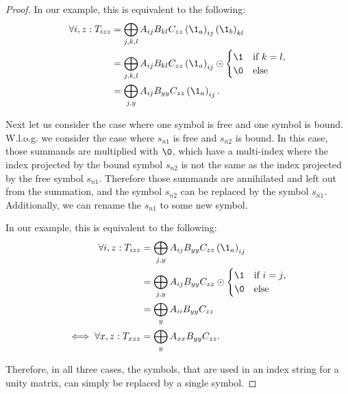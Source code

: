 \begin{proof}
    In our example, this is equivalent to the following:
    \begin{align*}
        \forall i,z: T_{izz} & = \bigoplus\limits_{j,k,l} A_{ij} B_{kl} C_{zz} \left(\1_a\right)_{ij} \left(\1_b\right)_{kl}          \\
                             & = \bigoplus\limits_{j,k,l} A_{ij} B_{kl} C_{zz} \left(\1_a\right)_{ij} \odot \begin{cases}
            \1 & \text{if $k = l$}, \\
            \0 & \text{else}
        \end{cases} \\
                             & = \bigoplus\limits_{j,y} A_{ij} B_{yy} C_{zz} \left(\1_a\right)_{ij}.
    \end{align*}

    Next let us consider the case where one symbol is free and one symbol is bound.
    W.l.o.g. we consider the case where $s_{n1}$ is free and $s_{n2}$ is bound.
    In this case, those summands are multiplied with $\0$,
    which have a multi-index where the index projected by the bound symbol $s_{n2}$ is not the same as the index projected by the free symbol $s_{n1}$.
    Therefore those summands are annihilated and left out from the summation, and the symbol $s_{n2}$ can be replaced by the symbol $s_{n1}$.
    Additionally, we can rename the $s_{n1}$ to some new symbol.

    In our example, this is equivalent to the following:
    \begin{align*}
        \forall i,z: T_{izz}      & = \bigoplus\limits_{j,y} A_{ij} B_{yy} C_{zz} \left(\1_a\right)_{ij}          \\
                                  & = \bigoplus\limits_{j,y} A_{ij} B_{yy} C_{zz} \odot \begin{cases}
            \1 & \text{if $i = j$}, \\
            \0 & \text{else}
        \end{cases} \\
                                  & = \bigoplus\limits_{y} A_{ii} B_{yy} C_{zz}                                   \\
        \iff \forall x,z: T_{xzz} & = \bigoplus\limits_{y} A_{xx} B_{yy} C_{zz}.
    \end{align*}

    Therefore, in all three cases, the symbols, that are used in an index string for a unity matrix, can simply be replaced by a single symbol.
\end{proof}
